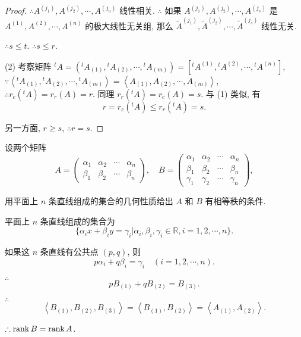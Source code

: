 \documentclass{ctexart}
\begin{document}
\begin{proof}
    $\therefore A^{(j_1)},A^{(j_2)},\cdots,A^{(j_u)}$ 线性相关. $\therefore$ 如果 $A^{(j_1)},A^{(j_2)},\cdots,A^{(j_s)}$ 是 $A^{(1)},A^{(2)},\cdots,A^{(n)}$ 的极大线性无关组, 那么 $\widetilde{A}^{(j_1)},\widetilde{A}^{(j_2)},\cdots,\widetilde{A}^{(j_s)}$ 线性无关.
    
    $\therefore s\leq t$. $\therefore s\leq r$.

    (2) 考察矩阵 ${}^tA=({}^tA_{(1)},{}^tA_{(2)},\cdots,{}^tA_{(m)})=[{}^tA^{(1)},{}^tA^{(2)},\cdots,{}^tA^{(n)}]$, $\because\left<{}^tA_{(1)},{}^tA_{(2)},\cdots,{}^tA_{(m)}\right>=\left<A_{(1)},A_{(2)},\cdots,A_{(m)}\right>$, $\therefore r_c({}^tA)=r_r(A)=r$. 同理 $r_r({}^tA)=r_c(A)=s$. 与 (1) 类似, 有
    \[r=r_c({}^tA)\leq r_r({}^tA)=s.\]

    另一方面, $r\geq s$, $\therefore r=s$.
\end{proof}
\setcounter{exercise}{2}
\begin{exercise}%
    设两个矩阵
    \[A=\begin{pmatrix}
        \alpha_1 & \alpha_2 & \cdots & \alpha_n \\
        \beta_1 &  \beta_2 & \cdots &  \beta_n
    \end{pmatrix},\quad B=\begin{pmatrix}
        \alpha_1 & \alpha_2 & \cdots & \alpha_n \\
        \beta_1 &  \beta_2 & \cdots &  \beta_n \\
        \gamma_1 & \gamma_2 & \cdots & \gamma_n
    \end{pmatrix},\]

    用平面上 $n$ 条直线组成的集合的几何性质给出 $A$ 和 $B$ 有相等秩的条件.
\end{exercise}
\begin{solution}
    平面上 $n$ 条直线组成的集合为
    \[\{\alpha_ix+\beta_iy=\gamma_i|\alpha_i,\beta_i,\gamma_i\in\mathbb{R},i=1,2,\cdots,n\}.\]

    如果这 $n$ 条直线有公共点 $(p,q)$, 则
    \[p\alpha_i+q\beta_i=\gamma_i\quad(i=1,2,\cdots,n).\]

    $\therefore$
    \[pB_{(1)}+qB_{(2)}=B_{(3)}.\]

    $\therefore$
    \[\left<B_{(1)},B_{(2)},B_{(3)}\right>=\left<B_{(1)},B_{(2)}\right>=\left<A_{(1)},A_{(2)}\right>.\]

    $\therefore\operatorname{rank} B=\operatorname{rank} A$.
\end{solution}
\end{document}
